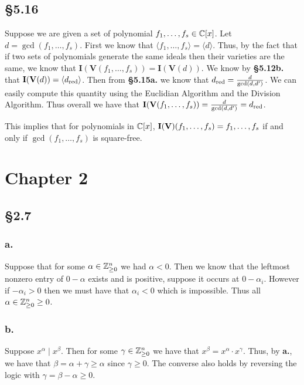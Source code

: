 \documentclass[letterpaper]{article}
\begin{document}
\subsection*{\S 5.16}

Suppose we are given a set of polynomial $f_{1}, \ldots, f_{s} \in \mathbb{C}[x]$. Let $d = \gcd(f_{1}, \ldots, f_{s})$. First we know that $\langle f_{1}, \ldots, f_{s} \rangle = \langle d \rangle$. Thus, by the fact that if two sets of polynomials generate the same ideals then their varieties are the same, we know that $\mathbf{I}(\textbf{V}(f_{1}, \ldots, f_{s})) = \mathbf{I}(\textbf{V}(d))$. We know by \textbf{\S 5.12b.} that $\mathbf{I}(\textbf{V}(d)) = \langle d_{\text{red}} \rangle$. Then from \textbf{\S 5.15a.} we know that $d_{\text{red}} = \frac{d}{\gcd(d, d')}$. We can easily compute this quantity using the Euclidian Algorithm and the Division Algorithm. Thus overall we have that $\mathbf{I}(\textbf{V}(f_{1}, \ldots, f_{s})) = \gen{\frac{d}{\gcd(d, d')}} = \gen{d_{\red}}$.

This implies that for polynomials in $\mathbb{C}[x]$, $\mathbf{I}\pqty{\textbf{V}}(f_{1}, \ldots, f_{s}) = \gen{f_{1}, \ldots, f_{s}}$ if and only if $\gcd(f_{1}, \ldots, f_{s})$ is square-free.

\clearpage

\section*{Chapter 2}

\subsection*{\S 2.7}

\subsubsection*{a.}

Suppose that for some $\alpha \in \mathbb{Z}_{\geq 0}^{n}$ we had $\alpha < 0$. Then we know that the leftmost nonzero entry of $0 - \alpha$ exists and is positive, suppose it occurs at $0 - \alpha_{i}$. However if $-\alpha_{i} > 0$ then we must have that $\alpha_{i} < 0$ which is impossible. Thus all $\alpha \in \mathbb{Z}_{\geq 0}^{n} \geq 0$.

\subsubsection*{b.}

Suppose $x^{\alpha} \mid x^{\beta}$.
Then for some $\gamma \in \mathbb{Z}_{\geq 0}^{n}$ we have that $x^{\beta} = x^{\alpha} \cdot x^{\gamma}$.
Thus, by \textbf{a.}, we have that $\beta = \alpha + \gamma \geq \alpha$ since $\gamma \geq 0$.
The converse also holds by reversing the logic with $\gamma = \beta - \alpha \geq 0$.
\end{document}
